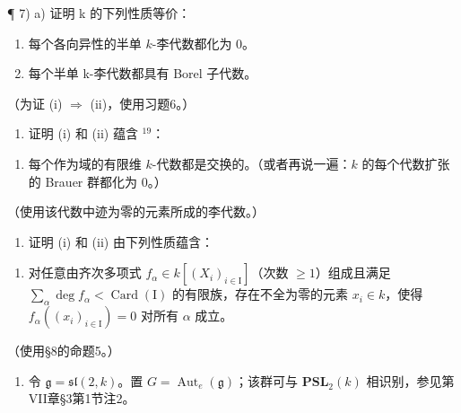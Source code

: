 ¶ 7) a) 证明 k 的下列性质等价：

\begin{enumerate}
\def\labelenumi{(\roman{enumi})}
\item
  每个各向异性的半单 \(k\)-李代数都化为 0。
\item
  每个半单 k-李代数都具有 Borel 子代数。
\end{enumerate}

（为证 (i) \(\Longrightarrow\) (ii)，使用习题6。）

\begin{enumerate}
\def\labelenumi{\alph{enumi})}
\setcounter{enumi}{1}
\tightlist
\item
  证明 (i) 和 (ii) 蕴含 \(^{19}\)：
\end{enumerate}

\begin{enumerate}
\def\labelenumi{(\roman{enumi})}
\setcounter{enumi}{2}
\tightlist
\item
  每个作为域的有限维 \(k\)-代数都是交换的。（或者再说一遍：\(k\) 的每个代数扩张的 Brauer 群都化为 0。）
\end{enumerate}

（使用该代数中迹为零的元素所成的李代数。）

\begin{enumerate}
\def\labelenumi{\alph{enumi})}
\setcounter{enumi}{2}
\tightlist
\item
  证明 (i) 和 (ii) 由下列性质蕴含：
\end{enumerate}

\begin{enumerate}
\def\labelenumi{(\roman{enumi})}
\setcounter{enumi}{3}
\tightlist
\item
  对任意由齐次多项式 \(f_{\alpha} \in k[(X_i)_{i \in \mathrm{I}}]\)（次数 \(\geq 1\)）组成且满足 \(\sum_{\alpha} \deg f_{\alpha} < \operatorname{Card}(\mathrm{I})\) 的有限族，存在不全为零的元素 \(x_i \in k\)，使得 \(f_{\alpha}((x_i)_{i \in \mathrm{I}}) = 0\) 对所有 \(\alpha\) 成立。
\end{enumerate}

（使用§8的命题5。）


\begin{enumerate}
\def\labelenumi{\arabic{enumi})}
\tightlist
\item
  令 \(\mathfrak{g} = \mathfrak{sl}(2, k)\)。置 \(G = \operatorname{Aut}_e(\mathfrak{g})\)；该群可与 \(\mathbf{PSL}_2(k)\) 相识别，参见第VII章§3第1节注2。
\end{enumerate}

